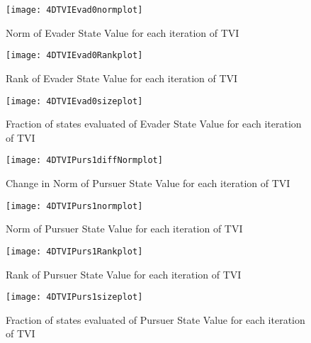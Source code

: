 \begin{figure}
\vspace{2.4in}
\centering
\texttt{[image: 4DTVIEvad0normplot]}
\caption{Norm of Evader State Value for each iteration of TVI}
\label{4DTVIEvad0normplot}
\end{figure}
\clearpage
\newpage

\begin{figure}
\vspace{2.4in}
\centering
\texttt{[image: 4DTVIEvad0Rankplot]}
\caption{Rank of Evader State Value for each iteration of TVI}
\label{4DTVIEvad0Rankplot}
\end{figure}
\clearpage
\newpage

\begin{figure}
\vspace{2.4in}
\centering
\texttt{[image: 4DTVIEvad0sizeplot]}
\caption{Fraction of states evaluated of Evader State Value for each iteration of TVI}
\label{4DTVIEvad0sizeplot}
\end{figure}
\clearpage
\newpage

\begin{figure}
\vspace{2.4in}
\centering
\texttt{[image: 4DTVIPurs1diffNormplot]}
\caption{Change in Norm of Pursuer State Value for each iteration of TVI}
\label{4DTVIPurs1diffNormplot}
\end{figure}
\clearpage
\newpage

\begin{figure}
\vspace{2.4in}
\centering
\texttt{[image: 4DTVIPurs1normplot]}
\caption{Norm of Pursuer State Value for each iteration of TVI}
\label{4DTVIPurs1normplot}
\end{figure}
\clearpage
\newpage

\begin{figure}
\vspace{2.4in}
\centering
\texttt{[image: 4DTVIPurs1Rankplot]}
\caption{Rank of Pursuer State Value for each iteration of TVI}
\label{4DTVIPurs1Rankplot}
\end{figure}
\clearpage
\newpage

\begin{figure}
\vspace{2.4in}
\centering
\texttt{[image: 4DTVIPurs1sizeplot]}
\caption{Fraction of states evaluated of Pursuer State Value for each iteration of TVI}
\label{4DTVIPurs1sizeplot}
\end{figure}
\clearpage
\newpage

